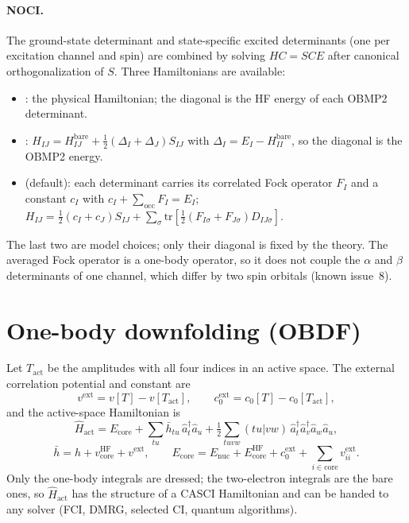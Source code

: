 \paragraph{NOCI.} The ground-state determinant and state-specific excited
determinants (one per excitation channel and spin) are combined by solving
$HC = SCE$ after canonical orthogonalization of $S$. Three Hamiltonians are
available:
\begin{itemize}
  \item {}: the physical Hamiltonian; the diagonal is the HF energy
        of each OBMP2 determinant.
  \item {}:
        $H_{IJ} = H^{\mathrm{bare}}_{IJ} + \tfrac12(\Delta_I+\Delta_J)S_{IJ}$
        with $\Delta_I = E_I - H^{\mathrm{bare}}_{II}$, so the diagonal is the
        OBMP2 energy.
  \item {} (default): each determinant carries its
        correlated Fock operator $F_I$ and a constant $c_I$ with
        $c_I+\sum_{\mathrm{occ}}F_I=E_I$;
        $H_{IJ}=\tfrac12(c_I+c_J)S_{IJ}+\sum_\sigma\mathrm{tr}
        [\tfrac12(F_{I\sigma}+F_{J\sigma})D_{IJ\sigma}]$.
\end{itemize}
The last two are model choices; only their diagonal is fixed by the theory.
The averaged Fock operator is a one-body operator, so it does not couple the
$\alpha$ and $\beta$ determinants of one channel, which differ by two spin
orbitals (known issue~8).

\section{One-body downfolding (OBDF)}
\label{sec:theory-obdf}

Let $T_{\mathrm{act}}$ be the amplitudes with all four indices in an active
space. The external correlation potential and constant are
\begin{equation}
  v^{\mathrm{ext}} = v[T] - v[T_{\mathrm{act}}],\qquad
  c_0^{\mathrm{ext}} = c_0[T]-c_0[T_{\mathrm{act}}],
\end{equation}
and the active-space Hamiltonian is
\begin{equation}
  \hat H_{\mathrm{act}} = E_{\mathrm{core}}
  + \sum_{tu}\bar h_{tu}\,\hat a^\dagger_t\hat a_u
  + \tfrac12\sum_{tuvw}(tu|vw)\,\hat a^\dagger_t\hat a^\dagger_v\hat a_w\hat a_u,
\end{equation}
\begin{equation}
  \bar h = h + v^{\mathrm{HF}}_{\mathrm{core}} + v^{\mathrm{ext}},\qquad
  E_{\mathrm{core}} = E_{\mathrm{nuc}} + E^{\mathrm{HF}}_{\mathrm{core}}
  + c_0^{\mathrm{ext}} + \sum_{i\in\mathrm{core}} v^{\mathrm{ext}}_{ii}.
\end{equation}
Only the one-body integrals are dressed; the two-electron integrals are the
bare ones, so $\hat H_{\mathrm{act}}$ has the structure of a CASCI
Hamiltonian and can be handed to any solver (FCI, DMRG, selected CI, quantum
algorithms).

